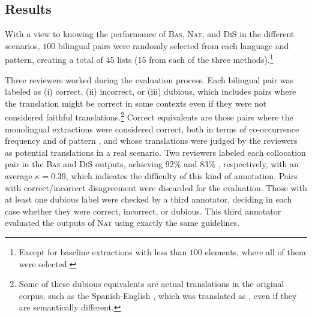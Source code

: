 \documentclass[output=paper
,modfonts
,nonflat]{langsci/langscibook}
\begin{document}
%
\subsection{Results}
With a view to knowing the performance of \textsc{Bas}, \textsc{Nat}, and \textsc{DiS}
in the different scenarios, $100$ bilingual  pairs were randomly selected
from each language and pattern, creating a total of 45 lists (15 from each of the three methods).\footnote{Except for baseline extractions with less than $100$ elements, where all of them were selected.}

Three reviewers worked during the evaluation process. Each bilingual 
pair was labeled as (i) correct, (ii) incorrect, or (iii) dubious, which includes pairs where the
translation might be correct in some contexts even if they were not considered faithful
translations.\footnote{Some of these dubious equivalents are actual translations in the
  original corpus, such as the Spanish-English , which was translated as ,
  even if they are semantically different.}
Correct  equivalents are those pairs where the monolingual extractions were
considered correct, both in terms of co-occurrence frequency and of  pattern
, and whose translations were judged by the reviewers as potential
translations in a real scenario.
Two reviewers labeled each collocation pair in the \textsc{Bas} and \textsc{DiS} outputs, achieving 92\% and 83\% , respectively, with an average $\kappa=0.39$, which
indicates the difficulty of this kind of annotation. Pairs with correct/incorrect disagreement
were discarded for the evaluation. Those with at least one dubious label were checked by a
third annotator, deciding in each case whether they were correct, incorrect, or dubious.
This third annotator evaluated the outputs of \textsc{Nat} using exactly the same guidelines.
\end{document}
